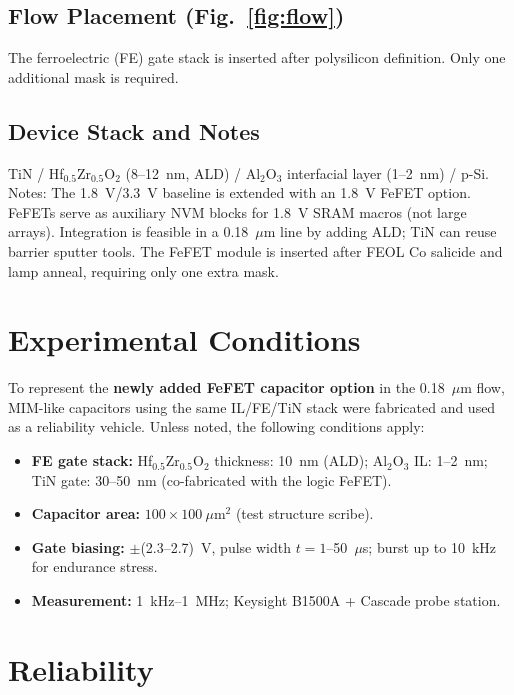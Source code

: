 \documentclass[conference]{IEEEtran}
\begin{document}
\subsection{Flow Placement (Fig.~\ref{fig:flow})}
The ferroelectric (FE) gate stack is inserted after polysilicon definition. Only one additional mask is required.

\subsection{Device Stack and Notes}
TiN / Hf$_{0.5}$Zr$_{0.5}$O$_2$ (8--12~nm, ALD) / Al$_2$O$_3$ interfacial layer (1--2~nm) / p-Si. Notes: The 1.8~V/3.3~V baseline is extended with an 1.8~V FeFET option. FeFETs serve as auxiliary NVM blocks for 1.8~V SRAM macros (not large arrays). Integration is feasible in a 0.18~$\mu$m line by adding ALD; TiN can reuse barrier sputter tools. The FeFET module is inserted after FEOL Co salicide and lamp anneal, requiring only one extra mask.

\section{Experimental Conditions}
To represent the \textbf{newly added FeFET capacitor option} in the 0.18~$\mu$m flow, MIM-like capacitors using the same IL/FE/TiN stack were fabricated and used as a reliability vehicle. Unless noted, the following conditions apply:
\begin{itemize}
  \item \textbf{FE gate stack:} Hf$_{0.5}$Zr$_{0.5}$O$_2$ thickness: 10~nm (ALD); Al$_2$O$_3$ IL: 1--2~nm; TiN gate: 30--50~nm (co-fabricated with the logic FeFET).
  \item \textbf{Capacitor area:} $100 \times 100~\mu\text{m}^2$ (test structure scribe).
  \item \textbf{Gate biasing:} $\pm$(2.3--2.7)~V, pulse width $t = 1$--50~$\mu$s; burst up to 10~kHz for endurance stress.
  \item \textbf{Measurement:} 1~kHz--1~MHz; Keysight B1500A + Cascade probe station.
\end{itemize}

\section{Reliability}\label{sec:reliability}
\end{document}
